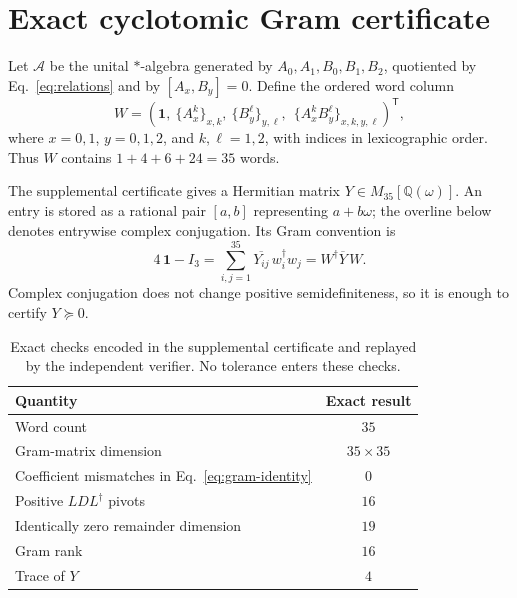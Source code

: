 \documentclass[aps,pra,reprint,superscriptaddress,nofootinbib,longbibliography]{revtex4-2}
\newcommand{\id}{\mathbf{1}}
\newcommand{\Q}{\mathbb{Q}}
\begin{document}
\section{Exact cyclotomic Gram certificate}

Let $\mathcal A$ be the unital $*$-algebra generated by
$A_0,A_1,B_0,B_1,B_2$, quotiented by Eq.~\eqref{eq:relations} and by
$[A_x,B_y]=0$.  Define the ordered word column
\begin{equation}
 W=\left(\id,\ \{A_x^k\}_{x,k},\ \{B_y^\ell\}_{y,\ell},\
 \ \{A_x^kB_y^\ell\}_{x,k,y,\ell}\right)^{\mathsf T},
 \label{eq:words}
\end{equation}
where $x=0,1$, $y=0,1,2$, and $k,\ell=1,2$, with indices in lexicographic
order.  Thus $W$ contains $1+4+6+24=35$ words.

The supplemental certificate gives a Hermitian matrix
$Y\in M_{35}[\Q(\omega)]$.  An entry is stored as a rational pair $[a,b]$
representing $a+b\omega$; the overline below denotes entrywise complex
conjugation.  Its Gram convention is
\begin{equation}
 4\,\id-I_3
 =\sum_{i,j=1}^{35}\overline{Y_{ij}}\,w_i^\dagger w_j
 =W^\dagger\overline{Y}\,W .
 \label{eq:gram-identity}
\end{equation}
Complex conjugation does not change positive semidefiniteness, so it is enough
to certify $Y\succeq0$.

\begin{table}[b]
\caption{Exact checks encoded in the supplemental certificate and replayed by
the independent verifier.  No tolerance enters these checks.}
\label{tab:checks}
\begin{ruledtabular}
\begin{tabular}{lc}
Quantity & Exact result\\
\hline
Word count & $35$\\
Gram-matrix dimension & $35\times35$\\
Coefficient mismatches in Eq.~\eqref{eq:gram-identity} & $0$\\
Positive $LDL^\dagger$ pivots & $16$\\
Identically zero remainder dimension & $19$\\
Gram rank & $16$\\
Trace of $Y$ & $4$\\
\end{tabular}
\end{ruledtabular}
\end{table}
\end{document}
